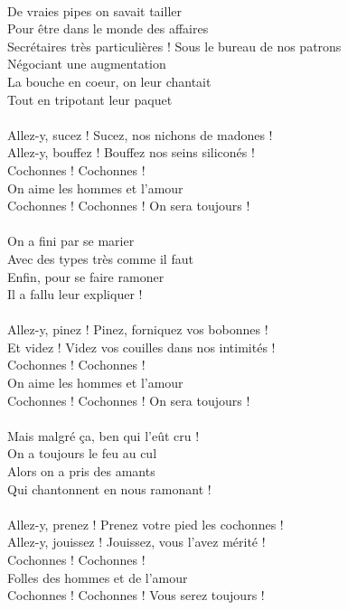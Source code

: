 \\De vraies pipes on savait tailler
\\Pour être dans le monde des affaires
\\Secrétaires très particulières !
\breakpage
Sous le bureau de nos patrons
\\Négociant une augmentation
\\La bouche en coeur, on leur chantait
\\Tout en tripotant leur paquet
\\\\Allez-y, sucez ! Sucez, nos nichons de madones !
\\Allez-y, bouffez ! Bouffez nos seins siliconés !
\\Cochonnes ! Cochonnes !
\\On aime les hommes et l'amour
\\Cochonnes ! Cochonnes ! On sera toujours !
\\\\On a fini par se marier
\\Avec des types très comme il faut
\\Enfin, pour se faire ramoner
\\Il a fallu leur expliquer !
\\\\Allez-y, pinez ! Pinez, forniquez vos bobonnes !
\\Et videz ! Videz vos couilles dans nos intimités !
\\Cochonnes ! Cochonnes !
\\On aime les hommes et l'amour
\\Cochonnes ! Cochonnes ! On sera toujours !
\\\\Mais malgré ça, ben qui l'eût cru !
\\On a toujours le feu au cul
\\Alors on a pris des amants
\\Qui chantonnent en nous ramonant !
\\\\Allez-y, prenez ! Prenez votre pied les cochonnes !
\\Allez-y, jouissez ! Jouissez, vous l'avez mérité !
\\Cochonnes ! Cochonnes !
\\Folles des hommes et de l'amour
\\Cochonnes ! Cochonnes ! Vous serez toujours !



\breakpage